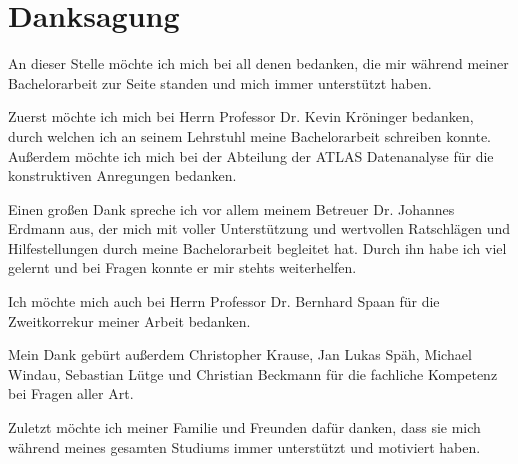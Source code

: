 \chapter*{Danksagung}
An dieser Stelle m\"ochte ich mich bei all denen bedanken,
die mir w\"ahrend meiner Bachelorarbeit zur Seite standen und mich immer unterst\"utzt haben.

Zuerst m\"ochte ich mich bei Herrn Professor Dr. Kevin Kr\"oninger
bedanken, durch welchen ich an seinem Lehrstuhl meine Bachelorarbeit
schreiben konnte. Au\ss erdem m\"ochte ich mich bei der Abteilung der
ATLAS Datenanalyse f\"ur die konstruktiven Anregungen bedanken.

Einen gro\ss en Dank spreche ich vor allem meinem Betreuer Dr.
Johannes Erdmann aus, der mich mit voller Unterst\"utzung und
wertvollen Ratschl\"agen und Hilfestellungen durch meine
Bachelorarbeit begleitet hat. Durch ihn habe ich viel
gelernt und bei Fragen konnte er mir stehts weiterhelfen.

Ich m\"ochte mich auch bei Herrn Professor Dr. Bernhard Spaan
f\"ur die Zweitkorrekur meiner Arbeit bedanken.

Mein Dank geb\"urt au\ss erdem Christopher Krause, Jan Lukas
Sp\"ah, Michael Windau, Sebastian L\"utge und Christian Beckmann
f\"ur die fachliche Kompetenz bei Fragen aller Art.

Zuletzt m\"ochte ich meiner Familie und Freunden daf\"ur danken,
dass sie mich w\"ahrend meines gesamten Studiums immer
unterst\"utzt und motiviert haben.
